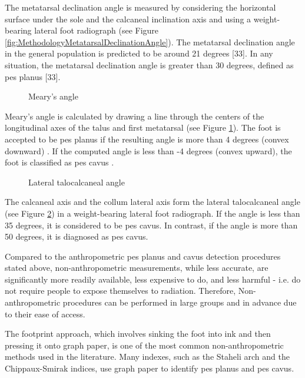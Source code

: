 The metatarsal declination angle is measured by considering the horizontal surface under the sole and the calcaneal inclination axis and using a weight-bearing lateral foot radiograph (see Figure \ref{fig:MethodologyMetatarsalDeclinationAngle}). The metatarsal declination angle in the general population is predicted to be around 21 degrees [33]. In any situation, the metatarsal declination angle is greater than 30 degrees, defined as pes planus [33].

\begin{figure}[htbp]
\centering
{}
\caption{Meary's angle \cite{radiopaediamearysangle}}
\label{fig:MethodologyMearysAngle}
\end{figure}

Meary's angle \cite{deniz2014ccocuklardaki} is calculated by drawing a line through the centers of the longitudinal axes of the talus and first metatarsal (see Figure \ref{fig:MethodologyMearysAngle}). The foot is accepted to be pes planus if the resulting angle is more than 4 degrees (convex downward) \cite{vanderwilde1988measurements}. If the computed angle is less than -4 degrees (convex upward), the foot is classified as pes cavus \cite{banks2001mcglamry}.

\begin{figure}[htbp]
\centering
{}
\caption{Lateral talocalcaneal angle \cite{radiopaediamearysangle}}
\label{fig:MethodologyLateralTalocalcanealAngle}
\end{figure}

The calcaneal axis and the collum lateral axis form the lateral talocalcaneal angle (see Figure \ref{fig:MethodologyLateralTalocalcanealAngle}) in a weight-bearing lateral foot radiograph.  If the angle is less than 35 degrees, it is considered to be pes cavus.  In contrast, if the angle is more than 50 degrees, it is diagnosed as pes cavus.

Compared to the anthropometric pes planus and cavus detection procedures stated above, non-anthropometric measurements, while less accurate, are significantly more readily available, less expensive to do, and less harmful - i.e. do not require people to expose themselves to radiation. Therefore, Non-anthropometric procedures can be performed in large groups and in advance due to their ease of access.

The footprint approach, which involves sinking the foot into ink and then pressing it onto graph paper, is one of the most common non-anthropometric methods used in the literature. Many indexes, such as the Staheli arch and the Chippaux-Smirak indices, use graph paper to identify pes planus and pes cavus.

